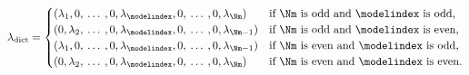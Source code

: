 \begin{equation}
\lambda_{\text{dict}} = 
  \begin{cases}
   (\lambda_{1}, 0, \:\ldots\:, 0, \lambda_{\modelindex}, 0, \:\ldots\:, 0, \lambda_{\Nm}) & \text{if $\Nm$ is odd and $\modelindex$ is odd,} \\
   (0, \lambda_{2},  \:\ldots\:, 0, \lambda_{\modelindex}, 0, \:\ldots\:, 0, \lambda_{\Nm - 1}) & \text{if $\Nm$ is odd and $\modelindex$ is even,} \\
   (\lambda_{1}, 0, \:\ldots\:, 0, \lambda_{\modelindex}, 0, \:\ldots\:, 0, \lambda_{\Nm - 1}) & \text{if $\Nm$ is even and $\modelindex$ is odd,} \\
   (0, \lambda_{2}, \:\ldots\:, 0, \lambda_{\modelindex}, 0, \:\ldots\:, 0, \lambda_{\Nm}) & \text{if $\Nm$ is even and $\modelindex$ is even.}
  \end{cases}
  \label{eqn:dictatorial-def-all}
\end{equation}
